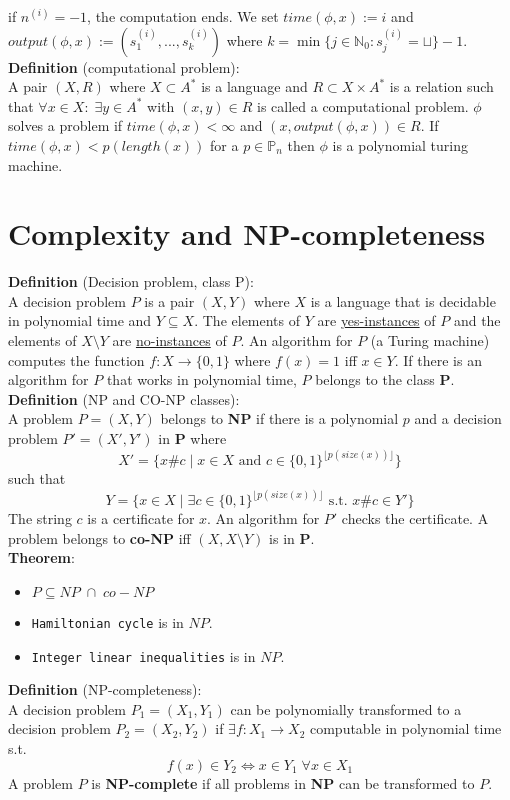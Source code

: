 \documentclass[a4paper, 12pt]{article}
\begin{document}
	if $n^{(i)} = -1$, the computation ends. We set $time(\phi, x) := i$ and $output(\phi, x) := (s_1^{(i)}, ..., s_k^{(i)})$ where $k = \min\{j \in \mathbb{N}_0 : s_j^{(i)} = \sqcup\} -1$.\\
	\textbf{Definition} (computational problem):\\
	A pair $(X, R)$ where $X\subset A^*$ is a language and $R\subset X \times A^*$ is a relation such that $\forall x \in X: \; \exists y \in A^*$ with $(x,y) \in R$ is called a computational problem. $\phi$ solves a problem if $time(\phi, x) < \infty$ and $(x, output(\phi, x)) \in R$. If $time(\phi, x) < p(length(x))$ for a $p \in \mathbb{P}_n$ then $\phi$ is a polynomial turing machine.\\
	\section{Complexity and NP-completeness}
	\textbf{Definition} (Decision problem, class P):\\
	A decision problem $P$ is a pair $(X,Y)$ where $X$ is a language that is decidable in polynomial time and $Y\subseteq X$. The elements of $Y$ are \underline{yes-instances} of $P$ and the elements of $X\setminus Y$ are \underline{no-instances} of $P$. An algorithm for $P$ (a Turing machine) computes the function $f: X\to \{0,1\}$ where $f(x) = 1$ iff $x \in Y$. If there is an algorithm for $P$ that works in polynomial time, $P$ belongs to the class \textbf{P}.\\
	\textbf{Definition} (NP and CO-NP classes):\\
	A problem $P = (X,Y)$ belongs to \textbf{NP} if there is a polynomial $p$ and a decision problem $P' = (X',Y')$ in \textbf{P} where \[X' = \{x\# c \;|\; x \in X \text{ and } c \in \{0,1\}^{\lfloor p(size(x))\rfloor}\}\]
	such that \[Y = \{x \in X \; |\; \exists c \in \{0,1\}^{\lfloor p(size(x))\rfloor} \text{ s.t. } x\#c \in Y'\}\]
	The string $c$ is a certificate for $x$. An algorithm for $P'$ checks the certificate. A problem belongs to \textbf{co-NP} iff $(X, X\setminus Y)$ is in \textbf{P}.\\
	\textbf{Theorem}:
	\begin{itemize}
		\item $P \subseteq NP \;\cap\; co-NP$
		\item \texttt{Hamiltonian cycle} is in $NP$.
		\item \texttt{Integer linear inequalities} is in $NP$.
	\end{itemize}
	\textbf{Definition} (NP-completeness):\\
	A decision problem $P_1 = (X_1, Y_1)$ can be polynomially transformed to a decision problem $P_2 = (X_2,Y_2)$ if $\exists f: X_1 \to X_2$ computable in polynomial time s.t. \[f(x) \in Y_2 \Leftrightarrow x \in Y_1 \; \forall x \in X_1\]
	A problem $P$ is \textbf{NP-complete} if all problems in \textbf{NP} can be transformed to $P$.
\end{document}
